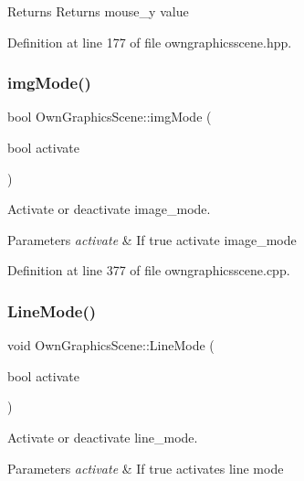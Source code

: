 \begin{DoxyReturn}{Returns}
Returns mouse\+\_\+y value 
\end{DoxyReturn}


Definition at line 177 of file owngraphicsscene.\+hpp.

\mbox{\label{classOwnGraphicsScene_acc6e7978a3f10889e439ceabd155a341}} 
\subsubsection{\texorpdfstring{img\+Mode()}{imgMode()}}
{\footnotesize\ttfamily bool Own\+Graphics\+Scene\+::img\+Mode (\begin{DoxyParamCaption}\item[{bool}]{activate }\end{DoxyParamCaption})}



Activate or deactivate image\+\_\+mode. 


\begin{DoxyParams}{Parameters}
{\em activate} & If true activate image\+\_\+mode \\
\hline
\end{DoxyParams}


Definition at line 377 of file owngraphicsscene.\+cpp.

\mbox{\label{classOwnGraphicsScene_a6b7e69131827f0ae64626af378ff9974}} 
\subsubsection{\texorpdfstring{Line\+Mode()}{LineMode()}}
{\footnotesize\ttfamily void Own\+Graphics\+Scene\+::\+Line\+Mode (\begin{DoxyParamCaption}\item[{bool}]{activate }\end{DoxyParamCaption})}



Activate or deactivate line\+\_\+mode. 


\begin{DoxyParams}{Parameters}
{\em activate} & If true activates line mode \\
\hline
\end{DoxyParams}


